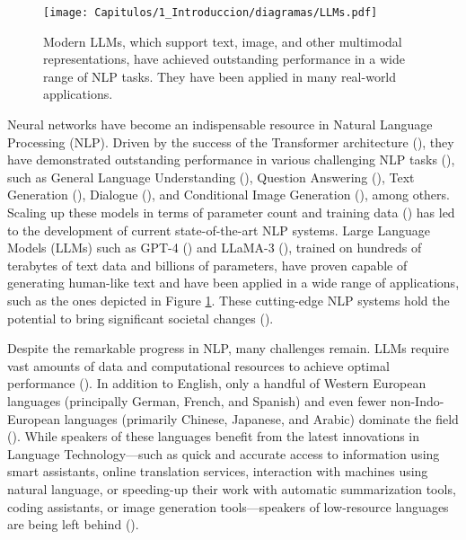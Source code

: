 \begin{figure}[htb]
    \centering
    \texttt{[image: Capitulos/1\_Introduccion/diagramas/LLMs.pdf]}
    \caption{Modern LLMs, which support text, image, and other multimodal representations, have achieved outstanding performance in a wide range of NLP tasks. They have been applied in many real-world applications.}
    \label{fig:llms}
\end{figure}


Neural networks have become an indispensable resource in Natural Language Processing (NLP). Driven by the success of the Transformer architecture (\cite{DBLP:conf/nips/VaswaniSPUJGKP17}), they have demonstrated outstanding performance in various challenging NLP tasks (\cite{DBLP:journals/csur/MinRSVNSAHR24}), such as General Language Understanding (\cite{DBLP:conf/iclr/WangSMHLB19}), Question Answering (\cite{DBLP:conf/acl/RajpurkarJL18}), Text Generation (\cite{brown2020language}), Dialogue (\cite{DBLP:journals/corr/abs-2201-08239}), and Conditional Image Generation (\cite{DBLP:conf/cvpr/RombachBLEO22}), among others. Scaling up these models in terms of parameter count and training data (\cite{chung-flan-instruction-models}) has led to the development of current state-of-the-art NLP systems. Large Language Models (LLMs) such as GPT-4 (\cite{openai2024gpt4technicalreport}) and LLaMA-3 (\cite{llama3modelcard}), trained on hundreds of terabytes of text data and billions of parameters, have proven capable of generating human-like text and have been applied in a wide range of applications, such as the ones depicted in Figure \ref{fig:llms}. These cutting-edge NLP systems hold the potential to bring significant societal changes (\cite{DBLP:journals/corr/abs-2108-07258}).



Despite the remarkable progress in NLP, many challenges remain. LLMs require vast amounts of data and computational resources to achieve optimal performance (\cite{DBLP:journals/corr/abs-2203-15556}). In addition to English, only a handful of Western European languages (principally German, French, and Spanish) and even fewer non-Indo-European languages (primarily Chinese, Japanese, and Arabic) dominate the field (\cite{joshi-etal-2020-state}). While speakers of these languages benefit from the latest innovations in Language Technology—such as quick and accurate access to information using smart assistants, online translation services, interaction with machines using natural language, or speeding-up their work with automatic summarization tools, coding assistants, or image generation tools—speakers of low-resource languages are being left behind (\cite{blasi-etal-2022-systematic}).

